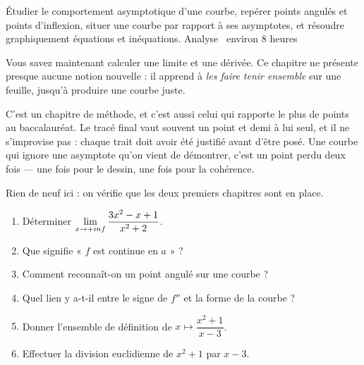   {Étudier le comportement asymptotique d'une courbe, repérer points angulés et
   points d'inflexion, situer une courbe par rapport à ses asymptotes, et
   résoudre graphiquement équations et inéquations.}
  {Analyse \textbullet\ environ 8 heures}

Vous savez maintenant calculer une limite et une dérivée. Ce chapitre ne
présente presque aucune notion nouvelle : il apprend à \emph{les faire tenir
ensemble} sur une feuille, jusqu'à produire une courbe juste.

C'est un chapitre de méthode, et c'est aussi celui qui rapporte le plus de
points au baccalauréat. Le tracé final vaut souvent un point et demi à lui
seul, et il ne s'improvise pas : chaque trait doit avoir été justifié avant
d'être posé. Une courbe qui ignore une asymptote qu'on vient de démontrer,
c'est un point perdu deux fois — une fois pour le dessin, une fois pour la
cohérence.

\begin{revision}
Rien de neuf ici : on vérifie que les deux premiers chapitres sont en place.

\begin{enumerate}[label=\textbf{\arabic*.}, leftmargin=*, itemsep=0.35em]
  \item Déterminer $\limpinf \dfrac{3x^{2}-x+1}{x^{2}+2}$.
  \item Que signifie « $f$ est continue en $a$ » ?
  \item Comment reconnaît-on un point angulé sur une courbe ?
  \item Quel lien y a-t-il entre le signe de $f''$ et la forme de la courbe ?
  \item Donner l'ensemble de définition de $x \mapsto \dfrac{x^{2}+1}{x-3}$.
  \item Effectuer la division euclidienne de $x^{2}+1$ par $x-3$.
\end{enumerate}
\end{revision}

